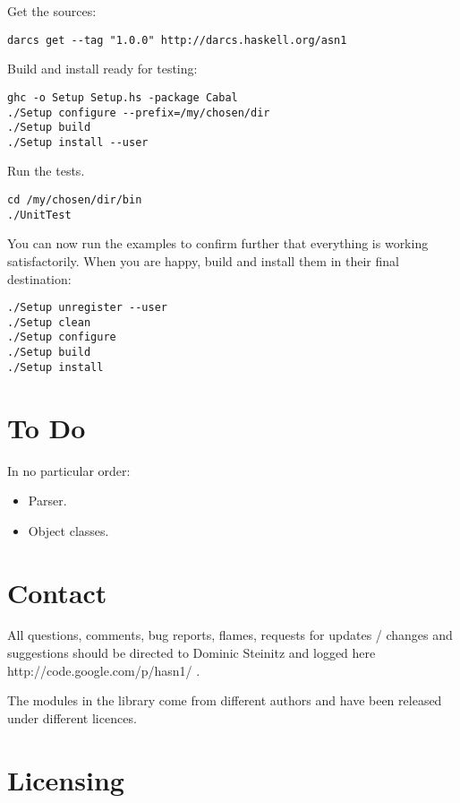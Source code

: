 \documentclass{article}
\begin{document}
Get the sources:

\lstset{language=shell,basicstyle=\ttfamily\small}
\begin{lstlisting}[frame=single]
darcs get --tag "1.0.0" http://darcs.haskell.org/asn1
\end{lstlisting}

Build and install ready for testing:

\begin{lstlisting}[frame=single]
ghc -o Setup Setup.hs -package Cabal
./Setup configure --prefix=/my/chosen/dir
./Setup build
./Setup install --user
\end{lstlisting}

Run the tests.

\begin{lstlisting}[frame=single]
cd /my/chosen/dir/bin
./UnitTest
\end{lstlisting}

You can now run the examples to confirm further that everything
is working satisfactorily.
When you are happy, build and install them in
their final destination:

\begin{lstlisting}[frame=single]
./Setup unregister --user
./Setup clean
./Setup configure
./Setup build
./Setup install
\end{lstlisting}

\section{To Do}

In no particular order:

\begin{itemize}
\item
Parser.
\item
Object classes.
\end{itemize}

\section{Contact}

All questions, comments, bug reports, flames, requests for 
updates / changes and suggestions should be directed to Dominic Steinitz and
logged
\htmladdnormallinkfoot
{here}
{http://code.google.com/p/hasn1/}
.


The modules in the library come from different authors and have been 
released under different licences. 

\section{Licensing}
\end{document}

